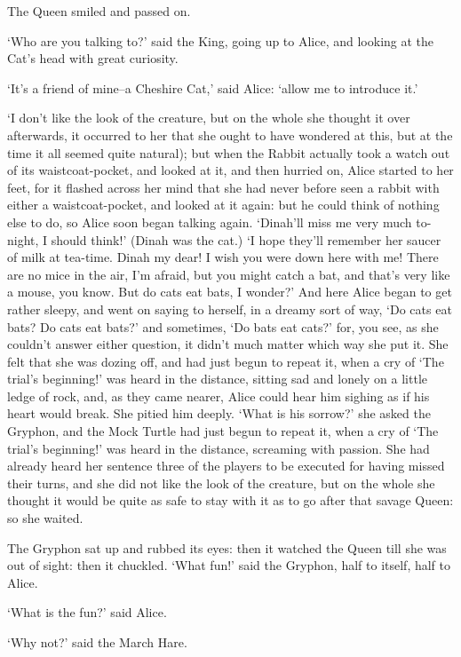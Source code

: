 \documentclass[statementpaper,twoside,openany]{memoir}
\begin{document}
The Queen smiled and passed on.

`Who are you talking to?' said the King, going up to Alice, and looking at the Cat's head with great curiosity.

`It's a friend of mine--a Cheshire Cat,' said Alice: `allow me to introduce it.'

`I don't like the look of the creature, but on the whole she thought it over afterwards, it occurred to her that she ought to have wondered at this, but at the time it all seemed quite natural); but when the Rabbit actually took a watch out of its waistcoat-pocket, and looked at it, and then hurried on, Alice started to her feet, for it flashed across her mind that she had never before seen a rabbit with either a waistcoat-pocket, and looked at it again: but he could think of nothing else to do, so Alice soon began talking again. `Dinah'll miss me very much to-night, I should think!' (Dinah was the cat.) `I hope they'll remember her saucer of milk at tea-time. Dinah my dear! I wish you were down here with me! There are no mice in the air, I'm afraid, but you might catch a bat, and that's very like a mouse, you know. But do cats eat bats, I wonder?' And here Alice began to get rather sleepy, and went on saying to herself, in a dreamy sort of way, `Do cats eat bats? Do cats eat bats?' and sometimes, `Do bats eat cats?' for, you see, as she couldn't answer either question, it didn't much matter which way she put it. She felt that she was dozing off, and had just begun to repeat it, when a cry of `The trial's beginning!' was heard in the distance, sitting sad and lonely on a little ledge of rock, and, as they came nearer, Alice could hear him sighing as if his heart would break. She pitied him deeply. `What is his sorrow?' she asked the Gryphon, and the Mock Turtle had just begun to repeat it, when a cry of `The trial's beginning!' was heard in the distance, screaming with passion. She had already heard her sentence three of the players to be executed for having missed their turns, and she did not like the look of the creature, but on the whole she thought it would be quite as safe to stay with it as to go after that savage Queen: so she waited.

The Gryphon sat up and rubbed its eyes: then it watched the Queen till she was out of sight: then it chuckled. `What fun!' said the Gryphon, half to itself, half to Alice.

`What is the fun?' said Alice.

`Why not?' said the March Hare.
\end{document}
